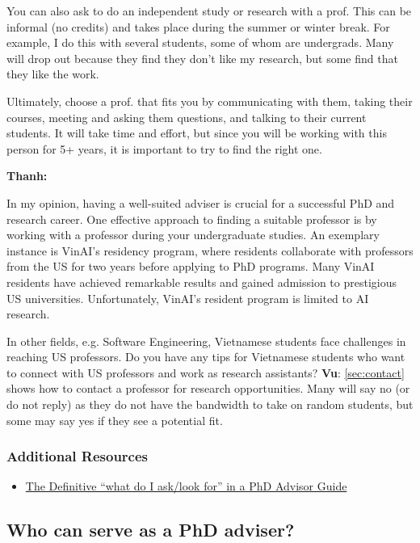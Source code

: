 \documentclass[oneside,11pt,dvipsnames]{book}
\newenvironment{commentbox}[1][]{
  \small
  \begin{mybox}
    {\small \textbf{#1}}
  }{
  \end{mybox}
}
\begin{document}
You can also ask to do an independent study or research with a prof. This can be informal (no credits) and takes place during the summer or winter break.  For example, I do this with several students, some of whom are undergrads. Many will drop out because they find they don't like my research, but some find that they like the work.

Ultimately, choose a prof. that fits you by communicating with them, taking their courses, meeting and asking them questions, and talking to their current students. It will take time and effort, but since you will be working with this person for 5+ years, it is important to try to find the right one.

\begin{commentbox}[Thanh:]
  In my opinion, having a well-suited adviser is crucial for a successful PhD and research career. One effective approach to finding a suitable professor is by working with a professor during your undergraduate studies. An exemplary instance is VinAI's residency program, where residents collaborate with professors from the US for two years before applying to PhD programs. Many VinAI residents have achieved remarkable results and gained admission to prestigious US universities. Unfortunately, VinAI's resident program is limited to AI research.

  In other fields, e.g. Software Engineering, Vietnamese students face challenges in reaching US professors. Do you have any tips for Vietnamese students who want to connect with US professors and work as research assistants?
  \tcblower
  \textbf{Vu}: \autoref{sec:contact} shows how to contact a professor for research opportunities. Many will say no (or do not reply) as they do not have the bandwidth to take on random students, but some may say yes if they see a potential fit.
\end{commentbox}

\subsubsection*{Additional Resources}
\begin{itemize}
  \item \href{https://www.cs.columbia.edu/wp-content/uploads/2019/03/Get-Advisor.pdf}{The Definitive ``what do I ask/look for'' in a PhD Advisor Guide}
\end{itemize}
\subsection{Who can serve as a PhD adviser?}\label{sec:faculty-types}
\end{document}
